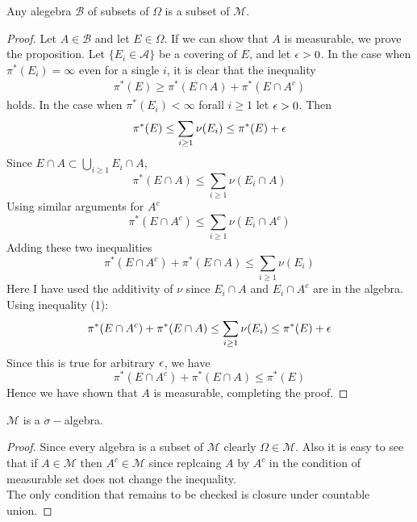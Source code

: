  \begin{proposition}
   Any alegebra $ \mathscr{B}$ of subsets of $\Omega$ is a subset of $ \mathscr{M}$.
 \end{proposition}
 \begin{proof}
   Let $A\in \mathscr{B}$ and let $E\in\Omega$. If we can show that $A$ is measurable, we prove the proposition. Let $\{E_i \in \mathscr{A}\}$ be a covering of $E$, and let $\epsilon>0$. In the case when $\pi^*(E_i) = \infty$ even for a single $i$, it is clear that the inequality
   \begin{align}
     \pi^*(E) \geq \pi^*(E\cap A) + \pi^*(E\cap A^c)
   \end{align}
   holds. In the case when $\pi^*(E_i) < \infty$ forall $i\geq 1$ let $\epsilon>0$. Then
   \[\pi^*(E) \leq \sum_{i\geq 1}\nu(E_i) \leq \pi^*(E) + \epsilon \]
   Since $E\cap A \subset \bigcup_{i\geq 1} E_i\cap A$,
   \[\pi^*(E\cap A) \leq \sum_{i \geq 1} \nu(E_i \cap A)\]
   Using similar arguments for $A^c$
   \[\pi^*(E\cap A^c) \leq \sum_{i \geq 1} \nu(E_i \cap A^c)\]
   Adding these two inequalities
   \[\pi^*(E\cap A^c) + \pi^*(E\cap A) \leq \sum_{i \geq 1} \nu(E_i)\]
   Here I have used the additivity of $\nu$ since $E_i\cap A$ and $E_i\cap A^c$ are in the algebra. Using inequality (1):
   \[\pi^*(E\cap A^c) + \pi^*(E\cap A) \leq \sum_{i \geq 1} \nu(E_i) \leq \pi^*(E) + \epsilon\]
   Since this is true for arbitrary $\epsilon$, we have
   \[\pi^*(E\cap A^c) + \pi^*(E\cap A)  \leq \pi^*(E) \]
   Hence we have shown that $A$ is measurable, completing the proof.
 \end{proof}
 \begin{proposition}
   $ \mathscr{M}$ is a $\sigma-$algebra.
 \end{proposition}
 \begin{proof}
   Since every algebra is a subset of $ \mathscr{M}$ clearly $\Omega \in \mathscr{M}$. Also it is easy to see that if $A\in \mathscr{M}$ then $A^c \in \mathscr{M}$ since replcaing $A$ by $A^c$ in the condition of measurable set does not change the inequality.\\
   The only condition that remains to be checked is closure under countable union. 
 \end{proof}
